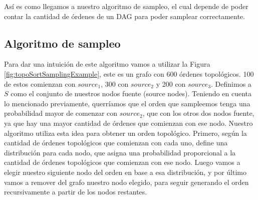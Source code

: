 Así es como llegamos a nuestro algoritmo de sampleo, el cual depende de poder contar la cantidad de órdenes de un DAG para poder samplear correctamente.  

\subsection{Algoritmo de sampleo}

Para dar una intuición de este algoritmo vamos a utilizar la Figura \ref{fig:topoSortSamplingExample}, este es un grafo con 600 órdenes topológicos. 100 de estos comienzan con $source_1$, 300 con $source_2$ y 200 con $source_3$. Definimos a $S$ como el conjunto de nuestros nodos fuente (source nodes). Teniendo en cuenta lo mencionado previamente, querríamos que el orden que sampleemos tenga una probabilidad mayor de comenzar con $source_2$, que con los otros dos nodos fuente, ya que hay una mayor cantidad de órdenes que comienzan con ese nodo. Nuestro algoritmo utiliza esta idea para obtener un orden topológico. Primero, según la cantidad de órdenes topológicos que comienzan con cada uno, define una distribución para cada nodo, que asigna una probabilidad proporcional a la cantidad de órdenes topológicos que comienzan con ese nodo. Luego vamos a elegir nuestro siguiente nodo del orden en base a esa distribución, y por último vamos a remover del grafo nuestro nodo elegido, para seguir generando el orden recursivamente a partir de los nodos restantes. 


